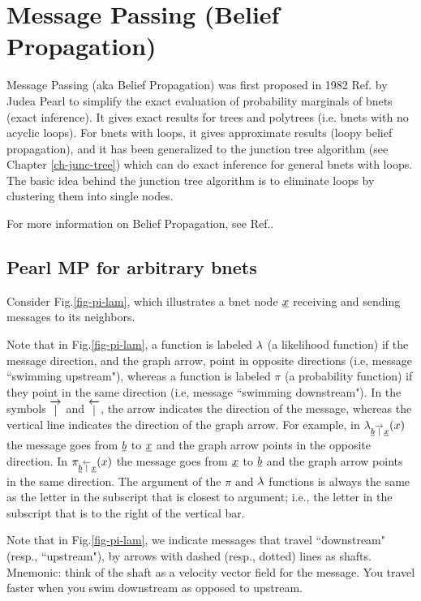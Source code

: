 \chapter{Message Passing 
(Belief Propagation)}\label{ch-mp}

Message Passing (aka Belief Propagation)
was first proposed in 1982
Ref.\cite{pearl1982reverend} by Judea Pearl
to simplify
the exact evaluation of probability marginals
of bnets (exact inference).
It gives exact results for trees and
polytrees (i.e. bnets with no acyclic
loops). For bnets with loops,
it gives approximate results 
(loopy belief propagation),
and it has been generalized to
the junction tree algorithm 
(see Chapter \ref{ch-junc-tree})
which can do exact inference
for general bnets with loops.
The basic idea behind
the junction tree algorithm
is to eliminate 
loops by clustering
them into single nodes.

For more information
on Belief Propagation,
see Ref.\cite{wiki-mp}.


\section*{Pearl MP for arbitrary bnets}



Consider Fig.\ref{fig-pi-lam},
which illustrates
a bnet node ${\underline{x}}$ receiving and sending
messages to its neighbors.

Note that in Fig.\ref{fig-pi-lam}, 
a function is labeled
$\lambda$ (a likelihood
function)  if the
message direction,
 and the  graph arrow,
 point in opposite directions
(i.e, message ``swimming upstream"),
whereas a 
function is labeled $\pi$
(a probability function)  if 
they point in the same direction
(i.e, message ``swimming downstream").
In the symbols $\overrightarrow{|}$
and $\overleftarrow{|}$, the arrow
indicates  the direction of the message,
whereas the vertical line indicates
the direction of the graph arrow.
For  example, in 
$\lambda_{{\underline{b}}\overrightarrow{|}{\underline{x}}}(x)$
the message goes from
${\underline{b}}$ to ${\underline{x}}$ and the 
graph arrow
points in the opposite direction.
In 
$\pi_{{\underline{b}}\overleftarrow{|}{\underline{x}}}(x)$
the message goes from
${\underline{x}}$ to ${\underline{b}}$ and the 
graph arrow
points in the same direction.
The argument of the $\pi$
and $\lambda$
functions is always the same 
as the letter in the subscript 
that is closest to argument; i.e., the
letter in the subscript that is
to the right of the vertical bar.

Note that in Fig.\ref{fig-pi-lam},
we indicate
messages that travel 
``downstream" 
(resp., ``upstream"), by
arrows with dashed (resp., dotted)
 lines as shafts.
Mnemonic: think of the shaft as a
 velocity vector field
for the message. 
You travel faster when
you swim downstream as opposed
to upstream.

